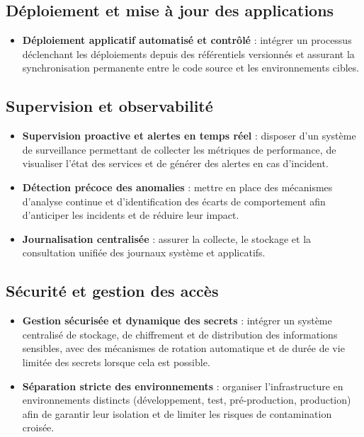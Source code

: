 \subsection{Déploiement et mise à jour des applications}

\begin{itemize}
	\item \textbf{Déploiement applicatif automatisé et contrôlé} : intégrer un processus déclenchant les déploiements depuis des référentiels versionnés et assurant la synchronisation permanente entre le code source et les environnements cibles.
\end{itemize}

\subsection{Supervision et observabilité}

\begin{itemize}
	\item \textbf{Supervision proactive et alertes en temps réel} : disposer d'un système de surveillance permettant de collecter les métriques de performance, de visualiser l'état des services et de générer des alertes en cas d'incident.

	\item \textbf{Détection précoce des anomalies} : mettre en place des mécanismes d'analyse continue et d'identification des écarts de comportement afin d'anticiper les incidents et de réduire leur impact.

	\item \textbf{Journalisation centralisée} : assurer la collecte, le stockage et la consultation unifiée des journaux système et applicatifs.
\end{itemize}

\subsection{Sécurité et gestion des accès}

\begin{itemize}
	\item \textbf{Gestion sécurisée et dynamique des secrets} : intégrer un système centralisé de stockage, de chiffrement et de distribution des informations sensibles, avec des mécanismes de rotation automatique et de durée de vie limitée des secrets lorsque cela est possible.

	\item \textbf{Séparation stricte des environnements} : organiser l'infrastructure en environnements distincts (développement, test, pré-production, production) afin de garantir leur isolation et de limiter les risques de contamination croisée.
\end{itemize}

